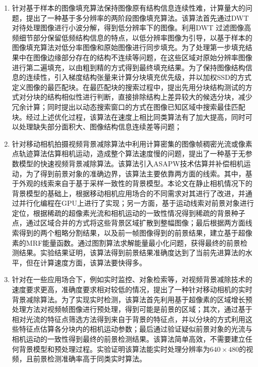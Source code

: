 \begin{enumerate}
  \item 针对基于样本的图像填充算法保持图像原有结构信息连续性难，计算量大的问题，提出了一种基于多分辨率的两阶段图像填充算法。该算法首先通过DWT对待处理图像进行小波分解，得到低分辨率下的图像。利用DWT 过滤图像高频细节部分保留低频结构信息的特点，以低分辨率图像为引导，以基于样本的图像填充算法对低分率图像和原始图像进行同步填充。为了处理第一步填充结果中在图像边缘部分存在的结构不连续等问题，在这些区域对原始分辨率图像进行第二遍填充，以由粗到精的方式得到最终填充结果。为了保持图像结构信息的连续性，引入梯度结构张量来计算分块填充优先级，并以加权SSD的方式定义图像的最匹配块。在最匹配块的搜索过程中，提出先用分块结构测试的方式对分块的结构相似性进行判断，直接排除结构上差异较大的候选分块，减少冗余计算；同时提出以动态搜索窗口的方式在图像已知区域中搜索最佳匹配块。经过上述优化过程，该算法在速度上相比同类算法有了加大提高，同时可以处理缺失部分面积大、图像结构信息连续差等问题；
  \item 针对移动相机拍摄视频背景减除算法中利用计算密集的图像帧稠密光流或像素点轨迹算法估算相机运动，造成整个算法速度慢的问题，提出了一种基于无参数模型的快速视频背景减除算法。该算法引入ASAPW技术估算并补偿相机运动，为了得到前景对象的准确边界，该算法主要依靠两方面的线索。其中，基于外观的线索来自于基于采样一致性的背景模型。本论文在静止相机情况下的背景模型的基础上，根据移动相机应用场合的不同需求对其进行了改进，并通过并行化编程在GPU上进行了实现；另一方面，基于运动线索对前景对象进行定位，根据稀疏的超像素光流和相机运动的一致性情况得到稀疏的背景种子点，通过区域合并的方式将这些背景区域扩散到整幅图像；最后根据两方面线索得到的两个粗略分割结果，以及前一帧图像得到的前景结果，建立基于超像素的MRF能量函数。通过图割算法求解能量最小化问题，获得最终的前景检测结果。实验结果证明，该算法得到前景结果准确度达到了当前先进算法的水平，但在计算速度方面，该算法要快得多。
  \item 针对在一些应用场合下，例如实时监控、对象检索等，对视频背景减除技术的速度要求更高，准确度要求相对较低的情况，提出了一种针对移动相机的实时背景减除算法。为了实现实时检测，该算法首先利用基于超像素的区域增长预处理方法对视频帧图像进行预处理，得到可能是前景的区域；其次，通过基于相对光流的特征点筛选方法得到来自于背景的特征点，并以分块的方式利用这些特征点估算各分块内的相机运动参数；最后通过验证疑似前景对象的光流与相机运动的一致性得到最终的前景检测结果。该算法简单高效，不需要建立任何背景模型和预处理过程。实验证明该算法能实时处理分辨率为$640 \times 480$的视频，且前景检测准确率高于同类实时算法。
\end{enumerate}

